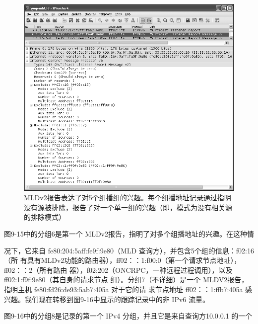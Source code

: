 \begin{figure}[ht]
    \centering
	\includegraphics[width=1.0\textwidth]{imgs/9/9-15.png}
	\caption{MLDv2报告表达了对5个组播组的兴趣。每个组播地址记录通过指明没有源被排除，报告了对一个单一组的兴趣（即，模式为没有相关源的排除模式）}
\end{figure}

图9-15中的分组6是第一个 MLDv2报告，指明了对多个组播地址的兴趣。在这种情

况下，它来自 fe80:204:5aff:fe9f:9e80（MLD 查询方），并包含5个组的信息：f02:16（所
有具有MLDv2功能的路由器），ff02：：1:f00:0（第一个请求节点地址），ff02：：2（所有路由
器），f02:202（ONCRPC，一种远程过程调用），以及 ff02:1:f9f:9e80（其自身的请求节点
组）。分组7（不详细）是一个 MLDV2报告，指明主机 fe80:fd26:de93:5ab7:405a 对于它的请
求节点地址 ff02：：1:ffb7:405a 感兴趣。我们现在转移到图9-16中显示的跟踪记录中的非 IPv6
流量。

图9-16中的分组8是记录的第一个 IPv4 分组，并且它是来自查询方10.0.0.1 的一个

